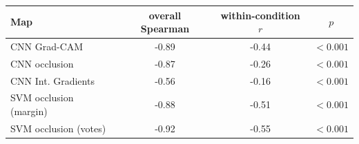 \begin{tabular}{@{}lccc@{}}\toprule
Map & overall Spearman & within-condition $r$ & $p$\\\midrule
CNN Grad-CAM & -0.89 & -0.44 & $<0.001$ \\
CNN occlusion & -0.87 & -0.26 & $<0.001$ \\
CNN Int. Gradients & -0.56 & -0.16 & $<0.001$ \\
SVM occlusion (margin) & -0.88 & -0.51 & $<0.001$ \\
SVM occlusion (votes) & -0.92 & -0.55 & $<0.001$ \\
\bottomrule\end{tabular}
